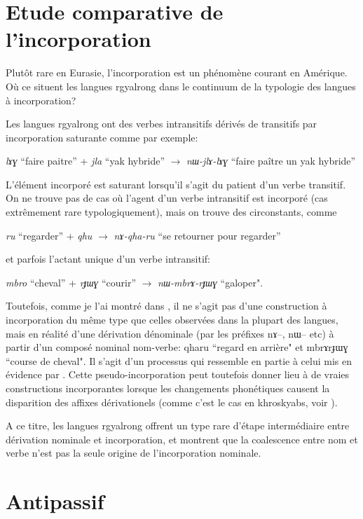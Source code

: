\documentclass[oldfontcommands,oneside,a4paper,11pt]{memoir}
\newcommand{\ipa}[1]{{\phon #1}} %
\begin{document}
\section{Etude comparative de l'incorporation} \label{sec:incorp}

 Plutôt rare en Eurasie, l'incorporation est un phénomène courant en Amérique. Où ce situent les langues rgyalrong dans le continuum de la typologie des langues à incorporation? 

Les langues rgyalrong ont des verbes intransitifs dérivés de transitifs par incorporation saturante comme par exemple:

\textit{lɤɣ} ``faire paitre'' + \textit{jla} ``yak hybride'' $\rightarrow $ \textit{nɯ-jlɤ-lɤɣ} ``faire paître un yak hybride''

L'élément incorporé est saturant lorsqu'il s'agit du patient d'un verbe transitif. On ne trouve pas de cas où l'agent d'un verbe intransitif est incorporé (cas extrêmement rare typologiquement), mais on trouve des circonstants, comme

\textit{ru} ``regarder'' + \textit{qhu} $\rightarrow $ \textit{nɤ-qha-ru} ``se retourner pour regarder''

et parfois l'actant unique d'un verbe intransitif:


\textit{mbro} ``cheval'' + \textit{rɟɯɣ} ``courir'' $\rightarrow $ \textit{nɯ-mbrɤ-rɟɯɣ} ``galoper".

Toutefois, comme je l'ai montré dans \citet{jacques12incorp}, il ne s'agit pas d'une construction à incorporation du même type que celles observées dans la plupart des langues, mais en réalité d'une dérivation dénominale (par les préfixes \ipa{nɤ}--, \ipa{nɯ}-- etc) à partir d'un composé nominal nom-verbe: \ipa{qharu} ``regard en arrière" et \ipa{mbrɤrɟɯɣ} ``course de cheval". Il s'agit d'un processus qui ressemble en partie à celui mis en évidence par \citet{benveniste66incorp}. Cette pseudo-incorporation peut toutefois donner lieu à de vraies constructions incorporantes lorsque les changements phonétiques causent la disparition des affixes dérivationels (comme c'est le cas en khroskyabs, voir \citealt{lai13affixale}).

A ce titre, les langues rgyalrong offrent un type rare d'étape intermédiaire entre dérivation nominale et incorporation, et montrent que la coalescence entre nom et verbe n'est pas la seule origine de l'incorporation nominale.

\section{Antipassif}
\end{document}
